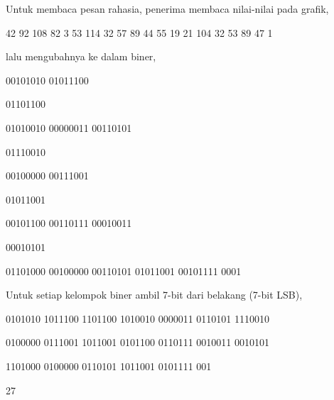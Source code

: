 \documentclass{article}
\begin{document}

Untuk membaca pesan rahasia, penerima membaca nilai-nilai pada grafik,

42 92 108 82 3 53 114 32 57 89 44 55 19 21 104 32 53 89 47 1

lalu mengubahnya ke dalam biner,

00101010 01011100

01101100

01010010 00000011 00110101

01110010

00100000 00111001

01011001

00101100 00110111 00010011

00010101

01101000 00100000 00110101 01011001 00101111 0001

Untuk setiap kelompok biner ambil 7-bit dari belakang (7-bit LSB),

0101010 1011100 1101100 1010010 0000011 0110101 1110010

0100000 0111001 1011001 0101100 0110111 0010011 0010101

1101000 0100000 0110101 1011001 0101111 001

27
\end{document}
